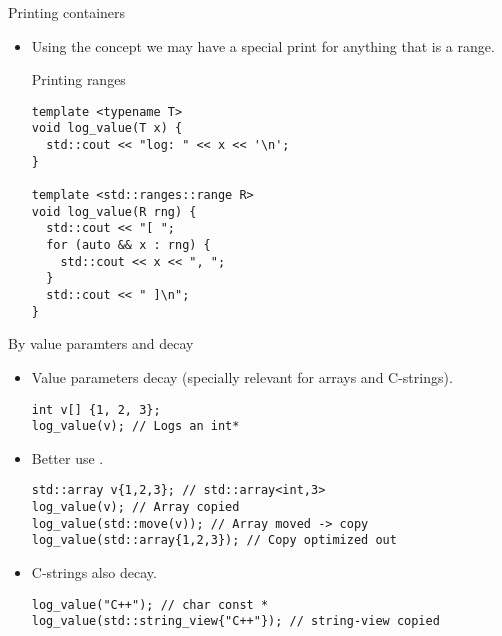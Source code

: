 \begin{frame}[t,fragile]{Printing containers}
\begin{itemize}
  \item Using the concept  we may have a special print
        for anything that is a range.

\begin{block}{Printing ranges}
\begin{lstlisting}
template <typename T>
void log_value(T x) {
  std::cout << "log: " << x << '\n';
}

template <std::ranges::range R>
void log_value(R rng) {
  std::cout << "[ ";
  for (auto && x : rng) {
    std::cout << x << ", ";
  }
  std::cout << " ]\n";
}
\end{lstlisting}
\end{block}
\end{itemize}
\end{frame}


\begin{frame}[t,fragile]{By value paramters and decay}
\begin{itemize}
  \item Value parameters decay (specially relevant for arrays and C-strings).
\begin{lstlisting}
int v[] {1, 2, 3};
log_value(v); // Logs an int*
\end{lstlisting}

  \item Better use .
\begin{lstlisting}
std::array v{1,2,3}; // std::array<int,3>
log_value(v); // Array copied
log_value(std::move(v)); // Array moved -> copy
log_value(std::array{1,2,3}); // Copy optimized out
\end{lstlisting}

  \item C-strings also decay.
\begin{lstlisting}
log_value("C++"); // char const *
log_value(std::string_view{"C++"}); // string-view copied
\end{lstlisting}
\end{itemize}
\end{frame}
